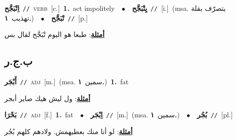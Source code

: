 \documentclass[10pt,a4paper,twoside]{article} %
\begin{document}
\begin{multicols}{2}
{{{{\setlength\topsep{0pt}\textbf{\foreignlanguage{arabic}{اِتْبَجَّح}}\ {\color{gray}\texttt{//}\color{black}}\ \textsc{verb}\ [c.]\ \textbf{1.}~act impolitely\ \ $\bullet$\ \ \setlength\topsep{0pt}\textbf{\foreignlanguage{arabic}{يِتْبَجَّح}}\ {\color{gray}\texttt{//}\color{black}}\ [i.]\ \color{gray}(msa. \foreignlanguage{arabic}{يتصرّف بقلة تهذيب}~\foreignlanguage{arabic}{\textbf{١.}})\color{black}\ \ $\bullet$\ \ \setlength\topsep{0pt}\textbf{\foreignlanguage{arabic}{تْبَجَّح}}\ {\color{gray}\texttt{//}\color{black}}\ [p.]\  \begin{flushright}\color{gray}\foreignlanguage{arabic}{\textbf{\underline{\foreignlanguage{arabic}{أمثلة}}}: طبعا هو اليوم تْبَجَّح لقال بس}\end{flushright}\color{black}} \vspace{2mm}

\vspace{-3mm}
\subsection*{\color{blue}\foreignlanguage{arabic}{ب.ج.ر}\color{blue}{}} 

{\setlength\topsep{0pt}\textbf{\foreignlanguage{arabic}{أَبْجَر}}\ {\color{gray}\texttt{//}\color{black}}\ \textsc{adj}\ [m.]\ \color{gray}(msa. \foreignlanguage{arabic}{سمين}~\foreignlanguage{arabic}{\textbf{١.}})\color{black}\ \textbf{1.}~fat\  \begin{flushright}\color{gray}\foreignlanguage{arabic}{\textbf{\underline{\foreignlanguage{arabic}{أمثلة}}}: ول ليش هيك صاير أبجر}\end{flushright}\color{black}} \vspace{2mm}

{\setlength\topsep{0pt}\textbf{\foreignlanguage{arabic}{بَحْرَا}}\ {\color{gray}\texttt{//}\color{black}}\ \textsc{adj}\ [f.]\ \textbf{1.}~fat\ \ $\bullet$\ \ \setlength\topsep{0pt}\textbf{\foreignlanguage{arabic}{اِبْجَر}}\ {\color{gray}\texttt{//}\color{black}}\ [m.]\ \color{gray}(msa. \foreignlanguage{arabic}{سمين}~\foreignlanguage{arabic}{\textbf{١.}})\color{black}\ \ $\bullet$\ \ \setlength\topsep{0pt}\textbf{\foreignlanguage{arabic}{بُجُر}}\ {\color{gray}\texttt{//}\color{black}}\ [pl.]\  \begin{flushright}\color{gray}\foreignlanguage{arabic}{\textbf{\underline{\foreignlanguage{arabic}{أمثلة}}}: لو أنا منك بعطيهمش. ولادهم كلهم بُجُر}\end{flushright}\color{black}} \vspace{2mm}

}}}
\end{multicols}
\end{document}
